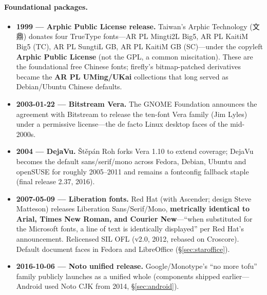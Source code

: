\documentclass[10pt,a4paper]{article}
\begin{document}
\paragraph{Foundational packages.}
\begin{itemize}[leftmargin=1.2em,itemsep=2pt]
\item \textbf{1999 --- Arphic Public License release.} Taiwan's Arphic Technology (文鼎)
donates four TrueType fonts---AR PL Mingti2L Big5, AR PL KaitiM Big5 (TC), AR PL
SungtiL GB, AR PL KaitiM GB (SC)---under the copyleft \textbf{Arphic Public License}
(not the GPL, a common miscitation). These are the foundational free Chinese fonts;
firefly's bitmap-patched derivatives became the \textbf{AR PL UMing/UKai} collections
that long served as Debian/Ubuntu Chinese defaults.\cite{l-arphic,l-arphic-2,l-uming}
\item \textbf{2003-01-22 --- Bitstream Vera.} The GNOME Foundation announces the
agreement with Bitstream to release the ten-font Vera family (Jim Lyles) under a
permissive license---the de facto Linux desktop faces of the mid-2000s.\cite{l-vera}
\item \textbf{2004 --- DejaVu.} \v{S}t\v{e}p\'an Roh forks Vera 1.10 to extend coverage;
DejaVu becomes the default sans/serif/mono across Fedora, Debian, Ubuntu and openSUSE
for roughly 2005--2011 and remains a fontconfig fallback staple (final release 2.37,
2016).\cite{l-dejavu}
\item \textbf{2007-05-09 --- Liberation fonts.} Red Hat (with Ascender; design Steve
Matteson) releases Liberation Sans/Serif/Mono, \textbf{metrically identical to Arial,
Times New Roman, and Courier New}---``when substituted for the Microsoft fonts, a line
of text is identically displayed'' per Red Hat's announcement. Relicensed SIL OFL
(v2.0, 2012, rebased on Croscore). Default document faces in Fedora and LibreOffice
(\S\ref{sec:staroffice}).\cite{l-liberation,l-liberation-2}
\item \textbf{2016-10-06 --- Noto unified release.} Google/Monotype's ``no more tofu''
family publicly launches as a unified whole (components shipped earlier---Android used
Noto CJK from 2014, \S\ref{sec:android}).\cite{l-noto}
\end{itemize}
\end{document}

